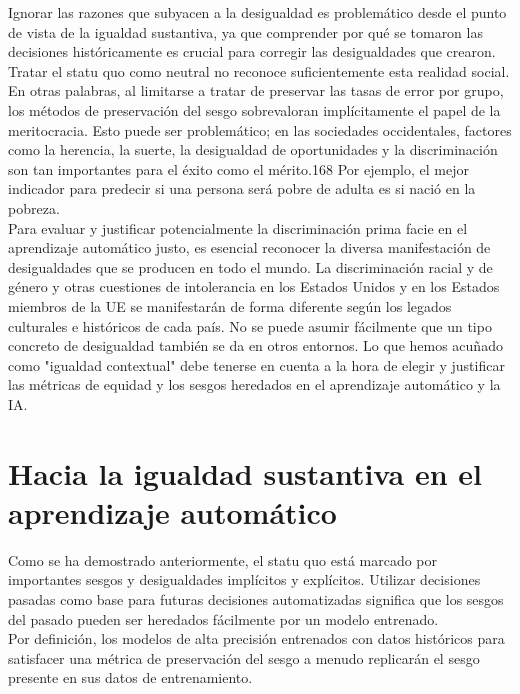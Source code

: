 Ignorar las razones que subyacen a la desigualdad es problemático desde el punto de vista de la igualdad sustantiva, ya que comprender por qué se tomaron las decisiones históricamente es crucial para corregir las desigualdades que crearon.\\

Tratar el statu quo como neutral no reconoce suficientemente esta realidad social. En otras palabras, al limitarse a tratar de preservar las tasas de error por grupo, los métodos de preservación del sesgo sobrevaloran implícitamente el papel de la meritocracia. Esto puede ser problemático; en las sociedades occidentales, factores como la herencia, la suerte, la desigualdad de oportunidades y la discriminación son tan importantes para el éxito como el mérito.168 Por ejemplo, el mejor indicador para predecir si una persona será pobre de adulta es si nació en la pobreza.\\

Para evaluar y justificar potencialmente la discriminación prima facie en el aprendizaje automático justo, es esencial reconocer la diversa manifestación de desigualdades que se producen en todo el mundo. La discriminación racial y de género y otras cuestiones de intolerancia en los Estados Unidos y en los Estados miembros de la UE se manifestarán de forma diferente según los legados culturales e históricos de cada país. No se puede asumir fácilmente que un tipo concreto de desigualdad también se da en otros entornos. Lo que hemos acuñado como "igualdad contextual" debe tenerse en cuenta a la hora de elegir y justificar las métricas de equidad y los sesgos heredados en el aprendizaje automático y la IA.


\section{Hacia la igualdad sustantiva en el aprendizaje automático}
Como se ha demostrado anteriormente, el statu quo está marcado por importantes sesgos y desigualdades implícitos y explícitos. Utilizar decisiones pasadas como base para futuras decisiones automatizadas significa que los sesgos del pasado pueden ser heredados fácilmente por un modelo entrenado.\\

Por definición, los modelos de alta precisión entrenados con datos históricos para satisfacer una métrica de preservación del sesgo a menudo replicarán el sesgo presente en sus datos de entrenamiento.\\

